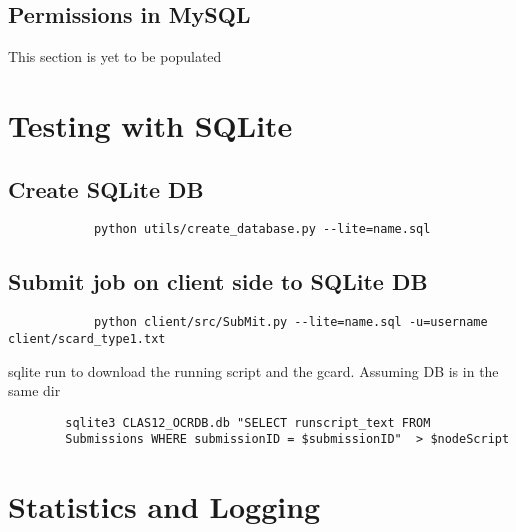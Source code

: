     \subsection{Permissions in MySQL}
    This section is yet to be populated
    \iffalse
    mysql permissions:
    show users:
    
    select user, host from mysql.db where db='CLAS12OCR';
    
    show grants:
    
    show grants for 'clas12jserver'@'%
    
    GRANT ALL ON . TO 'clas12jserver'@'%
    
    current users that access the db:
    
    show processlist;
    
    \fi

\section{Testing with SQLite}
    \subsection*{Create SQLite DB}
        \begin{lstlisting}
            python utils/create_database.py --lite=name.sql
        \end{lstlisting}
    
    \subsection*{Submit job on client side to SQLite DB}
        \begin{lstlisting}
            python client/src/SubMit.py --lite=name.sql -u=username client/scard_type1.txt
        \end{lstlisting}
        
        
         sqlite run to download the running script and the gcard. Assuming DB is in the same dir
    \begin{lstlisting}
        sqlite3 CLAS12_OCRDB.db "SELECT runscript_text FROM
        Submissions WHERE submissionID = $submissionID"  > $nodeScript
    \end{lstlisting}
    
\section{Statistics and Logging}
